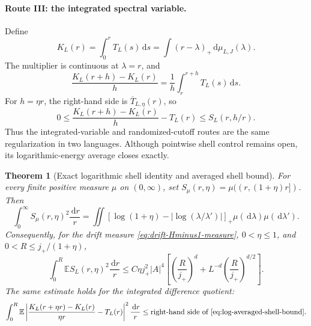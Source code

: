 \documentclass[11pt]{article}
\newtheorem{theorem}{Theorem}[section]
\theoremstyle{definition}
\theoremstyle{remark}
\newcommand{\E}{\mathbb E}
\newcommand{\abs}[1]{\left\lvert #1\right\rvert}
\newcommand{\dd}{\,\mathrm d}
\begin{document}
\paragraph{Route III: the integrated spectral variable.}
Define
\begin{equation}
 K_L(r)=\int_0^rT_L(s)\dd s
 =\int(r-\lambda)_+\dd\mu_{L,J}(\lambda).
 \label{eq:integrated-drift-spectral-measure}
\end{equation}
The multiplier is continuous at $\lambda=r$, and
\begin{equation}
 \boxed{
 \frac{K_L(r+h)-K_L(r)}h
 =\frac1h\int_r^{r+h}T_L(s)\dd s.}
 \label{eq:integrated-difference-quotient}
\end{equation}
For $h=\eta r$, the right-hand side is
$\overline T_{L,\eta}(r)$, so
\begin{equation}
 0\le\frac{K_L(r+h)-K_L(r)}h-T_L(r)
 \le S_L(r,h/r).
 \label{eq:integrated-shell-sandwich}
\end{equation}
Thus the integrated-variable and randomized-cutoff routes are the same
regularization in two languages.  Although pointwise shell control remains
open, its logarithmic-energy average closes exactly.

\begin{theorem}[Exact logarithmic shell identity and averaged shell bound]
\label{thm:logarithmic-shell-average}
For every finite positive measure $\mu$ on $(0,\infty)$, set
$S_\mu(r,\eta)=\mu((r,(1+\eta)r])$.  Then
\begin{equation}
 \boxed{
 \int_0^\infty S_\mu(r,\eta)^2\frac{\dd r}{r}
 =\iint
 \left[\log(1+\eta)-\abs{\log(\lambda/\lambda')}\right]_+
 \mu(\dd\lambda)\mu(\dd\lambda').}
 \label{eq:exact-log-shell-identity}
\end{equation}
Consequently, for the drift measure \eqref{eq:drift-Hminus1-measure},
$0<\eta\le1$, and $0<R\le j_+/(1+\eta)$,
\begin{equation}
 \boxed{
 \int_0^R\E S_L(r,\eta)^2\frac{\dd r}{r}
 \le C\eta j_+^2\abs A^4\left[
 \left(\frac R{j_+}\right)^d
 +L^{-d}\left(\frac R{j_+}\right)^{d/2}
 \right].}
 \label{eq:log-averaged-shell-bound}
\end{equation}
The same estimate holds for the integrated difference quotient:
\begin{equation}
 \int_0^R\E\left|\frac{K_L(r+\eta r)-K_L(r)}{\eta r}
 -T_L(r)\right|^2\frac{\dd r}{r}
 \le \textup{right-hand side of \eqref{eq:log-averaged-shell-bound}}.
 \label{eq:log-averaged-L2-differentiability}
\end{equation}
\end{theorem}
\end{document}
